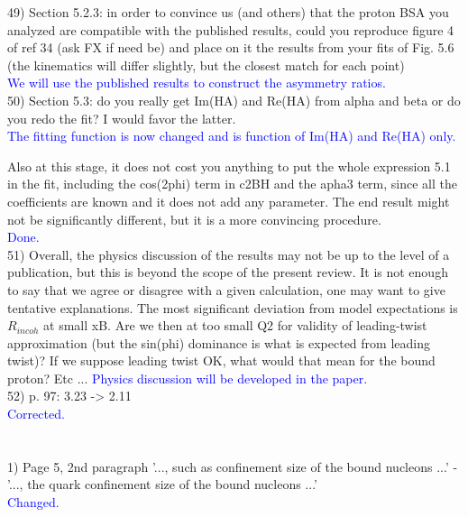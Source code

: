 49) Section 5.2.3: in order to convince us (and others) that the proton BSA you 
analyzed are compatible with the published results, could you reproduce figure 
4 of ref 34 (ask FX if need be) and place on it the results from your fits of 
Fig. 5.6 (the kinematics will differ slightly, but the closest match for each 
point)\\
\textcolor{blue}{We will use the published results to construct the asymmetry 
ratios.}\\ 

50) Section 5.3: do you really get Im(HA) and Re(HA) from alpha and beta or do 
you redo the fit? I would favor the latter.  \\
\textcolor{blue}{ The fitting function is now changed and is function of
Im(HA) and Re(HA) only.} 

Also at this stage, it does not cost you anything to put the whole expression 
5.1 in the fit, including the cos(2phi) term in c2BH and the apha3 term, since 
all the coefficients are known and it does not add any parameter. The end 
result might not be significantly different, but it is a more convincing 
procedure. \\
\textcolor{blue}{Done.}\\

51) Overall, the physics discussion of the results may not be up to the level of a 
publication, but this is beyond the scope of the present review. It is not 
enough to say that we agree or disagree with a given calculation, one may want 
to give tentative explanations. The most significant deviation from model 
expectations is $R_{incoh}$ at small xB. Are we then at too small Q2 for 
validity of leading-twist approximation (but the sin(phi) dominance is what is 
expected from leading twist)? If we suppose leading twist OK, what would that 
mean for the bound proton? Etc ...
\textcolor{blue}{Physics discussion will be developed in the paper.}\\

52) p. 97: 3.23 -> 2.11 \\
\textcolor{blue}{ Corrected.}\\

\section*{}

1) Page 5, 2nd paragraph
'..., such as confinement size of the bound nucleons ...' - '..., the quark 
confinement size of the bound nucleons ...' \\
\textcolor{blue}{ Changed.}\\

